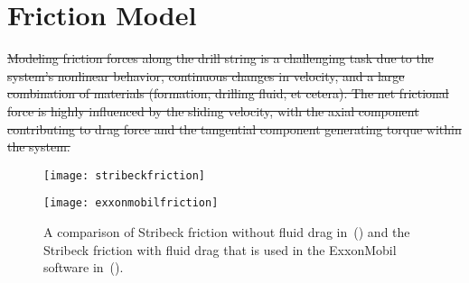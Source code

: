 \section{Friction Model}
\sout{
Modeling friction forces along the drill string is a challenging task due to the system's nonlinear behavior, continuous changes in velocity, and a large combination of materials (formation, drilling fluid, et cetera). The net frictional force is highly influenced by the sliding velocity, with the axial component contributing to drag force and the tangential component generating torque within the system.}
\begin{figure}
	\begin{minipage}[t]{\linewidth}
			\begin{minipage}[t]{0.3\linewidth}
				\centering
				\texttt{[image: stribeckfriction]}
				\label{fig:stribeckfriction}
			\end{minipage}
			\hfill
			\begin{minipage}[t]{0.65\linewidth}
				\centering
				\texttt{[image: exxonmobilfriction]}
				\label{fig:exxonmobilfriction}
			\end{minipage}
	\end{minipage}
	\caption[Comparison of friction models]{A comparison of Stribeck friction without fluid drag in~() and the Stribeck friction with fluid drag that is used in the ExxonMobil software in~().}\label{fig:frictionmodels}
\end{figure}

